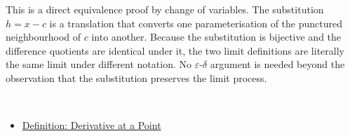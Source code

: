 \begin{remark*}
This is a direct equivalence proof by change of variables. The substitution $h = x - c$ is a translation that converts one parameterisation of the punctured neighbourhood of $c$ into another. Because the substitution is bijective and the difference quotients are identical under it, the two limit definitions are literally the same limit under different notation. No $\varepsilon$-$\delta$ argument is needed beyond the observation that the substitution preserves the limit process.
\end{remark*}

\begin{remark*}[Dependencies]~\\
\begin{itemize}
  \item \hyperref[def:derivative-at-a-point]{Definition: Derivative at a Point}
\end{itemize}
\end{remark*}
